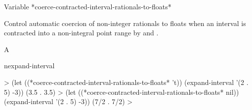 \documentclass[10pt,twoside,english,pdftex]{article}
\begin{document}
\begin{functiondoc}%
  {Variable}%
  {*coerce-contracted-interval-rationals-to-floats*}{}%

\fnsyntax

\fnpurpose Control automatic coercion of non-integer rationals to floats when
an interval is contracted into a non-integral point range by
 and
.

\fnpackage {}

\fnmodule {}

\fnvaluetype A 

\fninitialvalue \nil{}

\begin{alsos}{nexpand-interval}
\end{alsos}

\fnexamples
%
%
%
\W\supp
\begin{example}
  > (let ((*coerce-contracted-interval-rationals-to-floats* 't))
       (expand-interval '(2 . 5) -3))
  (3.5 . 3.5)
  > (let ((*coerce-contracted-interval-rationals-to-floats* nil))
       (expand-interval '(2 . 5) -3))
  (7/2 . 7/2)
  >
\end{example}

\end{functiondoc}

\end{document}
